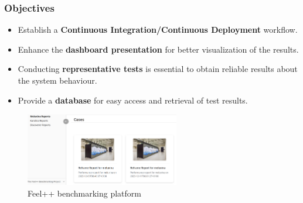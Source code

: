 \documentclass[10pt]{beamer}
\begin{document}
\begin{frame}
    \frametitle{\textbf{Objectives}}
    \begin{itemize}
        \addtolength{\itemsep}{8pt}
        \item Establish a \textbf{Continuous Integration/Continuous Deployment} workflow. \\
        \item Enhance the \textbf{dashboard presentation} for better visualization of the results. \\
        \item Conducting \textbf{representative tests} is essential to obtain reliable results about the system behaviour. \\
        \item Provide a \textbf{database} for easy access and retrieval of test results. \\
    \end{itemize}

    \begin{figure}
        \centering
        \includegraphics[width=0.6\textwidth]{../illustrations/feelpp-dashboard.png}
        \caption{Feel++ benchmarking platform}
    \end{figure}
\end{frame}
\end{document}
